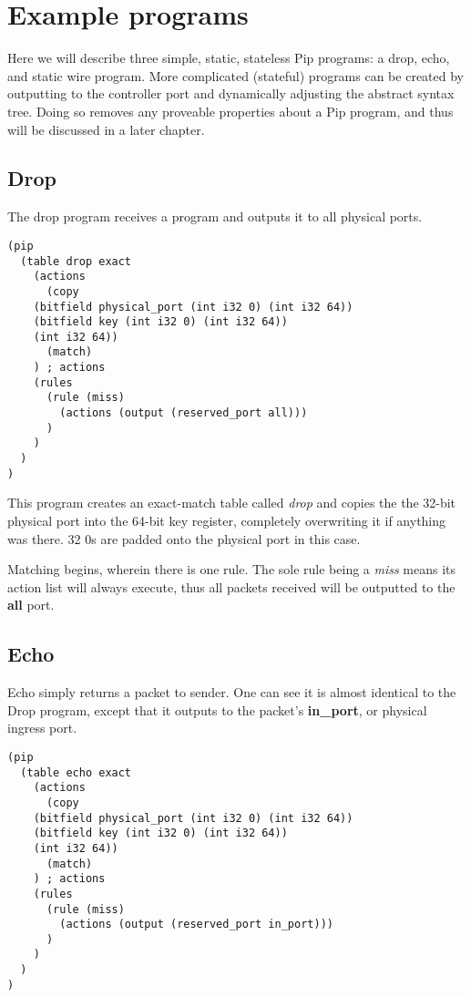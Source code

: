 
\section{Example programs}

Here we will describe three simple, static, stateless Pip programs: a drop, echo, and static wire program. More complicated (stateful) programs can be created by outputting to the controller port and dynamically adjusting the abstract syntax tree. Doing so removes any proveable properties about a Pip program, and thus will be discussed in a later chapter.

\subsection{Drop}
The drop program receives a program and outputs it to all physical ports.
\begin{verbatim}
(pip
  (table drop exact
    (actions
      (copy
	(bitfield physical_port (int i32 0) (int i32 64))
	(bitfield key (int i32 0) (int i32 64))
	(int i32 64))
      (match)
    ) ; actions
    (rules
      (rule (miss)
        (actions (output (reserved_port all)))
      )
    )
  )
)
\end{verbatim}
This program creates an exact-match table called \textit{drop} and copies the the 32-bit physical port into the 64-bit key register, completely overwriting it if anything was there. 32 0s are padded onto the physical port in this case.

Matching begins, wherein there is one rule. The sole rule being a \textit{miss} means its action list will always execute, thus all packets received will be outputted to the \textbf{all} port.
\subsection{Echo}
Echo simply returns a packet to sender. One can see it is almost identical to the Drop program, except that it outputs to the packet's \textbf{in\_port}, or physical ingress port.
\begin{verbatim}
(pip
  (table echo exact
    (actions
      (copy
	(bitfield physical_port (int i32 0) (int i32 64))
	(bitfield key (int i32 0) (int i32 64))
	(int i32 64))
      (match)
    ) ; actions
    (rules
      (rule (miss)
        (actions (output (reserved_port in_port)))
      )
    )
  )
)
\end{verbatim}

